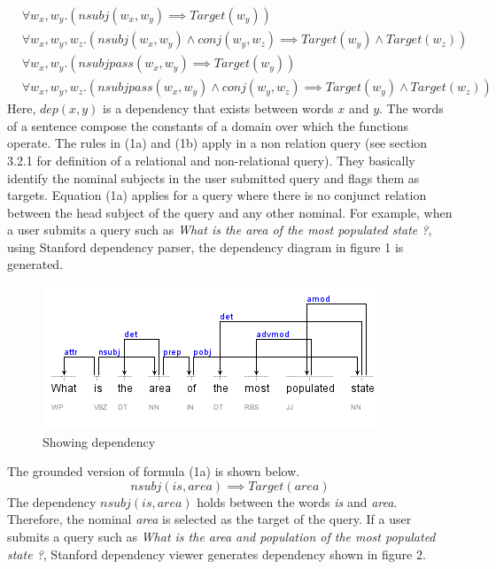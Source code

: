 \documentclass[review]{elsarticle}
\begin{document}
\begin{subequations}
\begin{align}
& \forall w_x,w_y.(nsubj(w_x,w_y)\implies Target(w_y)) \\
&\forall  w_x,w_y,w_z.(nsubj(w_x,w_y)\land conj(w_y,w_z)\implies Target(w_y)\land Target(w_z))
\end{align}
\end{subequations}
\begin{subequations}
\begin{align}
&\forall  w_x,w_y.(nsubjpass(w_x,w_y)\implies Target(w_y))\\
&\forall   w_x,w_y,w_z.(nsubjpass(w_x,w_y)\land conj(w_y,w_z)\implies Target(w_y)\land Target(w_z))
\end{align}
\end{subequations}
Here,  $dep(x,y)$ is a dependency that exists between words $x$ and $y$. The words of a sentence compose the constants of a domain over which the functions operate. The rules in  (1a) and (1b) apply  in a non relation query (see section 3.2.1 for definition of a relational and non-relational query). They basically identify the  nominal subjects in the user submitted query and flags them as targets. Equation (1a) applies for a query where there is no conjunct relation between the head subject of the query and any other nominal. For example, when a user submits a  query such as \textit{What is the area of the most populated state ?}, using  Stanford dependency parser, the dependency diagram in figure 1 is generated.
\begin{figure}[h]
	\centering
		\includegraphics[scale=0.7,angle=0]{example2.png}
		\caption{Showing dependency }
	\label{fig:example2}
\end{figure}
The grounded version of formula (1a) is shown below.
\begin{equation*}
nsubj(is,area)\implies Target(area)
\end{equation*}
The dependency $nsubj(is,area)$ holds between the words \textit{is} and \textit{area}. Therefore, the nominal \textit{area}  is selected as the target of the query. If a user submits a query such as \textit{What is the area and population of the most populated state ?}, Stanford dependency viewer generates dependency shown in figure 2.
\end{document}

